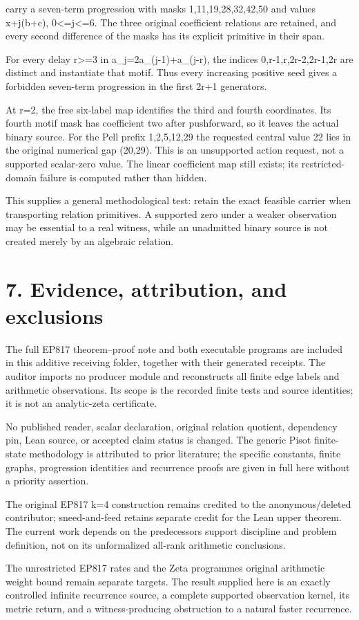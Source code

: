 carry a seven-term progression with masks 1,11,19,28,32,42,50 and values x+j(b+c), 0\textless=j\textless=6. The three original coefficient relations are retained, and every second difference of the masks has its explicit primitive in their span.

For every delay r\textgreater=3 in a\_j=2a\_(j-1)+a\_(j-r), the indices 0,r-1,r,2r-2,2r-1,2r are distinct and instantiate that motif. Thus every increasing positive seed gives a forbidden seven-term progression in the first 2r+1 generators.

At r=2, the free six-label map identifies the third and fourth coordinates. Its fourth motif mask has coefficient two after pushforward, so it leaves the actual binary source. For the Pell prefix 1,2,5,12,29 the requested central value 22 lies in the original numerical gap (20,29). This is an unsupported action request, not a supported scalar-zero value. The linear coefficient map still exists; its restricted-domain failure is computed rather than hidden.

This supplies a general methodological test: retain the exact feasible carrier when transporting relation primitives. A supported zero under a weaker observation may be essential to a real witness, while an unadmitted binary source is not created merely by an algebraic relation.

\section{7. Evidence, attribution, and exclusions}\label{n15-evidence-attribution-and-exclusions}

The full EP817 theorem--proof note and both executable programs are included in this additive receiving folder, together with their generated receipts. The auditor imports no producer module and reconstructs all finite edge labels and arithmetic observations. Its scope is the recorded finite tests and source identities; it is not an analytic-zeta certificate.

No published reader, scalar declaration, original relation quotient, dependency pin, Lean source, or accepted claim status is changed. The generic Pisot finite-state methodology is attributed to prior literature; the specific constants, finite graphs, progression identities and recurrence proofs are given in full here without a priority assertion.

The original EP817 k=4 construction remains credited to the anonymous/deleted contributor; sneed-and-feed retains separate credit for the Lean upper theorem. The current work depends on the predecessor\textquotesingle s support discipline and problem definition, not on its unformalized all-rank arithmetic conclusions.

The unrestricted EP817 rates and the Zeta programme\textquotesingle s original arithmetic weight bound remain separate targets. The result supplied here is an exactly controlled infinite recurrence source, a complete supported observation kernel, its metric return, and a witness-producing obstruction to a natural faster recurrence.
